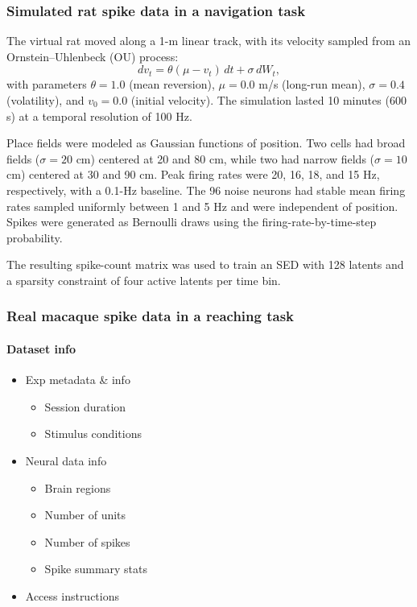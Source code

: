 \subsubsection{Simulated rat spike data in a navigation task}
\label{subsubsection:synthetic_results_details}

The virtual rat moved along a 1-m linear track, with its velocity sampled from an Ornstein--Uhlenbeck (OU) process:
\begin{equation}
dv_t = \theta(\mu-v_t)\,dt + \sigma\,dW_t,
\end{equation}
with parameters $\theta=1.0$ (mean reversion), $\mu=0.0$ m/s (long-run mean), $\sigma=0.4$ (volatility), and $v_0=0.0$ (initial velocity). The simulation lasted 10 minutes (600 s) at a temporal resolution of 100 Hz.

Place fields were modeled as Gaussian functions of position. Two cells had broad fields ($\sigma=20$ cm) centered at 20 and 80 cm, while two had narrow fields ($\sigma=10$ cm) centered at 30 and 90 cm. Peak firing rates were 20, 16, 18, and 15 Hz, respectively, with a 0.1-Hz baseline. The 96 noise neurons had stable mean firing rates sampled uniformly between 1 and 5 Hz and were independent of position. Spikes were generated as Bernoulli draws using the firing-rate-by-time-step probability.

The resulting spike-count matrix was used to train an SED with 128 latents and a sparsity constraint of four active latents per time bin.
\subsubsection{Real macaque spike data in a reaching task}
\label{subsubsection:churchland_results_additional}

\paragraph{Dataset info}
\begin{itemize}

    \item Exp metadata \& info
    
    \begin{itemize}
        \item Session duration
        \item Stimulus conditions
    \end{itemize}
    
    \item Neural data info
    
    \begin{itemize}
        \item Brain regions
        \item Number of units
        \item Number of spikes
        \item Spike summary stats
    \end{itemize}

    \item Access instructions

\end{itemize}

